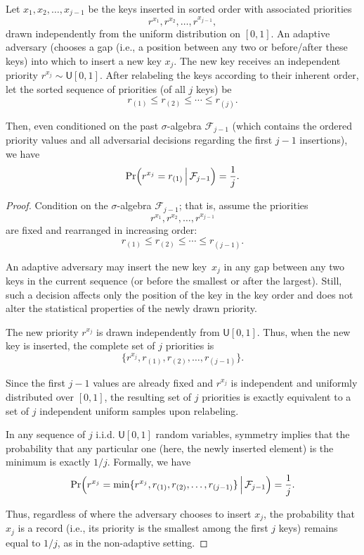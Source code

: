 \begin{lemma}\label{lemma:tre}
Let $x_1, x_2, \ldots, x_{j-1}$ be the keys inserted in sorted order with associated priorities 
$$r^{x_1}, r^{x_2}, \ldots, r^{x_{j-1}},$$
drawn independently from the uniform distribution on $[0,1]$. An adaptive adversary (chooses a gap (i.e., a position between any two or before/after these keys) into which to insert a new key $x_j$. The new key receives an independent priority $r^{x_j} \sim \mathsf{U}[0,1]$. After relabeling the keys according to their inherent order, let the sorted sequence of priorities (of all $j$ keys) be
$$r_{(1)} \le r_{(2)} \le \cdots \le r_{(j)}.$$

Then, even conditioned on the past $\sigma$-algebra $\mathcal{F}_{j-1}$ (which contains the ordered priority values and all adversarial decisions regarding the first $j-1$ insertions), we have
$$\Pr\Bigl(r^{x_j} = r_{(1)} \,\Big|\, \mathcal{F}_{j-1}\Bigr) = \frac{1}{j}.$$

\end{lemma}

\begin{proof}
Condition on the $\sigma$-algebra $\mathcal{F}_{j-1}$; that is, assume the priorities
$$r^{x_1}, r^{x_2}, \ldots, r^{x_{j-1}}$$
are fixed and rearranged in increasing order:
$$r_{(1)} \le r_{(2)} \le \cdots \le r_{(j-1)}.$$

An adaptive adversary may insert the new key~$x_j$ in any gap between any two keys in the current sequence (or before the smallest or after the largest). Still, such a decision affects only the position of the key in the key order and does not alter the statistical properties of the newly drawn priority.

The new priority $r^{x_j}$ is drawn independently from $\mathsf{U}[0,1]$. Thus, when the new key is inserted, the complete set of $j$ priorities is
$$\{r^{x_j}, r_{(1)}, r_{(2)}, \ldots, r_{(j-1)}\}.$$

Since the first $j-1$ values are already fixed and $r^{x_j}$ is independent and uniformly distributed over $[0,1]$, the resulting set of $j$ priorities is exactly equivalent to a set of $j$ independent uniform samples upon relabeling.

In any sequence of $j$ i.i.d. $\mathsf{U}[0,1]$ random variables, symmetry implies that the probability that any particular one (here, the newly inserted element) is the minimum is exactly $1/j$. Formally, we have
$$\Pr\Bigl(r^{x_j} = \min\{r^{x_j},r_{(1)}, r_{(2)}, \ldots, r_{(j-1)}\}\,\Big|\, \mathcal{F}_{j-1} \Bigr) = \frac{1}{j}.$$

Thus, regardless of where the adversary chooses to insert $x_j$, the probability that $x_j$ is a record (i.e., its priority is the smallest among the first $j$ keys) remains equal to $1/j$, as in the non-adaptive setting.
\end{proof}

